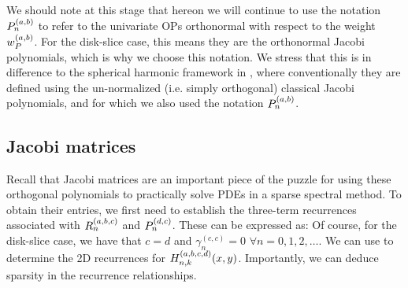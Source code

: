 \remark We should note at this stage that hereon we will continue to use the notation ${P}_n^{(a, b)}$ to refer to the univariate OPs orthonormal with respect to the weight $w_P^{(a,b)}$. For the disk-slice case, this means they are the orthonormal Jacobi polynomials, which is why we choose this notation. We stress that this is in difference to the spherical harmonic framework in , where conventionally they are defined using the un-normalized (i.e. simply orthogonal) classical Jacobi polynomials, and for which we also used the notation ${P}_n^{(a, b)}$.



\subsection{Jacobi matrices}

Recall that Jacobi matrices are an important piece of the puzzle for using these orthogonal polynomials to practically solve PDEs in a sparse spectral method. To obtain their entries, we first need to establish the three-term recurrences associated with $R_n^{(a,b,c)}$ and ${P}_n^{(d,c)}$. These can be expressed as: 
Of course, for the disk-slice case, we have that $c = d$ and $\gamma_{n}^{(c,c)} = 0$ $\forall n=0,1,2,\dots$. We can use  to determine the 2D recurrences for $H_{n,k}^{(a,b,c,d)}(x,y)$. Importantly, we can deduce sparsity in the recurrence relationships.

